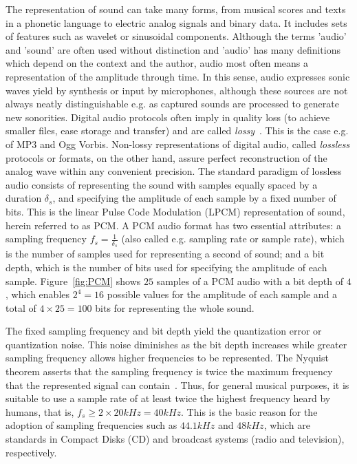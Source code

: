 The representation of sound can take many forms,
from musical scores and texts in a phonetic language to electric analog signals and binary data.
It includes sets of features such as wavelet or sinusoidal components.
Although the terms 'audio' and 'sound' are often used without distinction
and 'audio' has many definitions which depend on the context and the author,
audio most often means a representation of the amplitude through time.
In this sense,
audio expresses sonic waves yield by synthesis or input by microphones,
although these sources are not always neatly distinguishable
e.g. as captured sounds are processed to generate new sonorities.
Digital audio protocols often imply in quality loss (to achieve smaller files, ease storage and transfer)
and are called \emph{lossy}~\cite{loss}.
This is the case e.g. of MP3 and Ogg Vorbis.
Non-lossy representations of digital audio, called \emph{lossless} protocols or formats,
on the other hand, assure perfect reconstruction of the analog wave within any convenient precision.
The standard paradigm of lossless audio consists of
representing the sound with samples equally spaced
by a duration $\delta_s$, and specifying the amplitude of each sample by a fixed number of bits.
This is the linear Pulse Code Modulation (LPCM) representation of sound,
herein referred to as PCM.
A PCM audio format has two essential attributes:
a sampling frequency $f_s=\frac{1}{\delta_s}$ (also called e.g. sampling rate or sample rate),
which is the number of samples used for representing a second of sound;
and a bit depth, which is the number of bits used for specifying the amplitude of each sample.
Figure~\ref{fig:PCM} shows $25$ samples of a PCM audio with a bit depth of $4$,
which enables $2^4=16$ possible values for the amplitude of each sample
and a total of $4 \times 25= 100$ bits for representing the whole sound.

The fixed sampling frequency and bit depth
yield the quantization error or quantization noise.
This noise diminishes as the bit depth increases
while greater sampling frequency allows higher frequencies to be represented.
The Nyquist theorem asserts that the sampling frequency
is twice the maximum frequency that the represented signal can contain~\cite{Openheim}.
Thus, for general musical purposes, it is suitable to use a sample rate of
at least twice the highest frequency heard by humans,
that is, $f_s \geq 2\times 20kHz = 40kHz$.
This is the basic reason for the adoption of sampling frequencies
such as $44.1kHz$ and $48kHz$,
which are standards in Compact Disks (CD)
and broadcast systems (radio and television), respectively.

